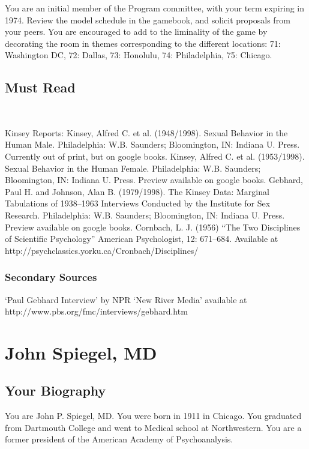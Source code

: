 \begin{refsection}
You are an initial member of the Program committee, with your term expiring in 1974. Review the model schedule in the gamebook, and solicit proposals from your peers. You are encouraged to add to the liminality of the game by decorating the room in themes corresponding to the different locations: 71: Washington DC, 72: Dallas, 73: Honolulu, 74: Philadelphia, 75: Chicago.

\section{Must Read}
\label{mustread}

~\citep{Mead:1928uk}

Kinsey Reports:
Kinsey, Alfred C. et al. (1948\slash 1998). Sexual Behavior in the Human Male. Philadelphia: W.B. Saunders; Bloomington, IN: Indiana U. Press. Currently out of print, but on google books.
Kinsey, Alfred C. et al. (1953\slash 1998). Sexual Behavior in the Human Female. Philadelphia: W.B. Saunders; Bloomington, IN: Indiana U. Press. Preview available on google books.
Gebhard, Paul H. and Johnson, Alan B. (1979\slash 1998). The Kinsey Data: Marginal Tabulations of 1938--1963 Interviews Conducted by the Institute for Sex Research. Philadelphia: W.B. Saunders; Bloomington, IN: Indiana U. Press. Preview available on google books.
Cornbach, L. J. (1956) ``The Two Disciplines of Scientific Psychology'' American Psychologist, 12: 671--684. Available at http:\slash \slash psychclassics.yorku.ca\slash Cronbach\slash Disciplines\slash 

\subsection{Secondary Sources}
\label{secondarysources}

`Paul Gebhard Interview' by NPR `New River Media' available at http:\slash \slash www.pbs.org\slash fmc\slash interviews\slash gebhard.htm

\chapter{John Spiegel, MD}
\label{johnspiegelmd}

\section{Your Biography}
\label{yourbiography}

You are John P. Spiegel, MD. You were born in 1911 in Chicago. You graduated from Dartmouth College and went to Medical school at Northwestern. You are a former president of the American Academy of Psychoanalysis.


\end{refsection}
